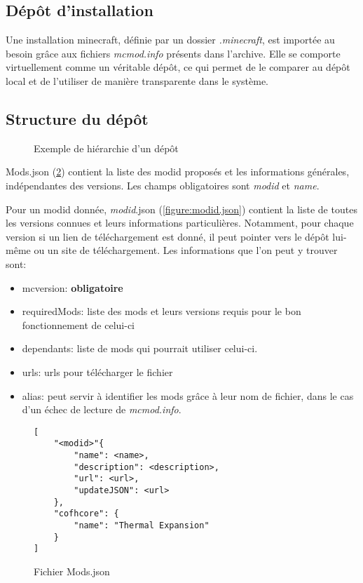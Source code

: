 \documentclass{article}
\begin{document}
\subsection{Dépôt d'installation}
\label{subsection:depot_installation}
Une installation minecraft, définie par un dossier \textit{.minecraft}, est importée au besoin grâce aux fichiers \textit{mcmod.info} présents dans l'archive.
Elle se comporte virtuellement comme un véritable dépôt, ce qui permet de le comparer au dépôt local et de l'utiliser de manière transparente dans le système.

\subsection{Structure du dépôt}
\begin{figure}
\caption{Exemple de hiérarchie d'un dépôt}
\label{fig:hierarchie}
\end{figure}

Mods.json (\ref{figure:mods.json}) contient la liste des modid proposés et les informations générales, indépendantes des versions.
Les champs obligatoires sont \textit{modid} et \textit{name}.

Pour un modid donnée, \textit{modid}.json (\ref{figure:modid.json}) contient la liste de toutes les versions connues et leurs informations particulières.
Notamment, pour chaque version si un lien de téléchargement est donné, il peut pointer vers le dépôt lui-même ou un site de téléchargement.
Les informations que l'on peut y trouver sont:
\begin{itemize}
    \item mcversion: \textbf{obligatoire}
    \item requiredMods: liste des mods et leurs versions requis pour le bon fonctionnement de celui-ci
    \item dependants: liste de mods qui pourrait utiliser celui-ci.
    \item urls: urls pour télécharger le fichier
    \item alias: peut servir à identifier les mods grâce à leur nom de fichier, dans le cas d'un échec de lecture de \textit{mcmod.info}.
\end{itemize}

\begin{figure}
\centering
\begin{verbatim}
[
    "<modid>"{
        "name": <name>,
        "description": <description>,
        "url": <url>,
        "updateJSON": <url>
    },
    "cofhcore": {
        "name": "Thermal Expansion"
    }
]
\end{verbatim}
\caption{Fichier Mods.json}
\label{figure:mods.json}
\end{figure}
\end{document}
